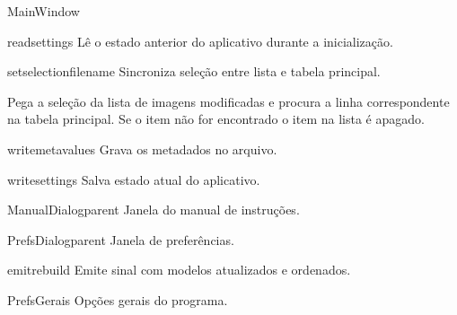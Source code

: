 \documentclass[letterpaper,10pt,portuguese]{manual}
\begin{document}
\begin{classdesc}{MainWindow}{}
\hypertarget{veliger.MainWindow.readsettings}{}\begin{methoddesc}{readsettings}{}
Lê o estado anterior do aplicativo durante a inicialização.
\end{methoddesc}

\hypertarget{veliger.MainWindow.setselection}{}\begin{methoddesc}{setselection}{filename}
Sincroniza seleção entre lista e tabela principal.

Pega a seleção da lista de imagens modificadas e procura a linha
correspondente na tabela principal. Se o item não for encontrado o item
na lista é apagado.
\end{methoddesc}

\hypertarget{veliger.MainWindow.writemeta}{}\begin{methoddesc}{writemeta}{values}
Grava os metadados no arquivo.
\end{methoddesc}

\hypertarget{veliger.MainWindow.writesettings}{}\begin{methoddesc}{writesettings}{}
Salva estado atual do aplicativo.
\end{methoddesc}
\end{classdesc}

\hypertarget{veliger.ManualDialog}{}\begin{classdesc}{ManualDialog}{parent}
Janela do manual de instruções.
\end{classdesc}

\hypertarget{veliger.PrefsDialog}{}\begin{classdesc}{PrefsDialog}{parent}
Janela de preferências.

\hypertarget{veliger.PrefsDialog.emitrebuild}{}\begin{methoddesc}{emitrebuild}{}
Emite sinal com modelos atualizados e ordenados.
\end{methoddesc}
\end{classdesc}

\hypertarget{veliger.PrefsGerais}{}\begin{classdesc}{PrefsGerais}{}
Opções gerais do programa.
\end{classdesc}
\end{document}

